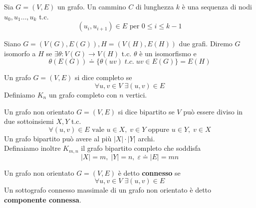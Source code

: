 \begin{definizione}[Cammino]
    Sia \(G=(V,E)\) un grafo. Un cammino \(C\) di lunghezza \(k\) è una sequenza di nodi \(u_0,u_1 \dots, u_k\) t.c.
    \begin{equation}
        (u_i,u_{i+1})\in E \text{ per } 0 \leq i \leq k-1
    \end{equation}
\end{definizione}

\begin{definizione}
    Siano \(G=(V(G),E(G)), H=(V(H),E(H))\) due grafi. Diremo \(G\) isomorfo a \(H\) se \(\exists \theta : V(G) \to V(H)\) t.c. \(\theta\) è un isomorfismo e
    \begin{equation}
        \theta(E(G)) \doteq \{ \theta(uv) \; t.c.\; uv \in E(G)\} = E(H)
    \end{equation}
\end{definizione}

\begin{definizione}
    Un grafo \(G=(V,E)\) si dice completo se
    \begin{equation}
        \forall u,v \in V \; \exists (u,v) \in E
    \end{equation}
    Definiamo \(K_n\) un grafo completo con \(n\) vertici.
\end{definizione}

\begin{definizione}
    Un grafo non orientato \(G=(V,E)\) si dice bipartito se \(V\) può essere diviso in due sottoinsiemi \(X,Y\) t.c.
    \begin{equation}
        \forall (u,v) \in E \text{ vale } u\in X,\; v\in Y \text{ oppure } u\in Y,\; v\in X
    \end{equation}
    Un grafo bipartito può avere al più \(|X|\cdot |Y|\) archi. \\
    Definaiamo inoltre \(K_{m,n}\) il grafo bipartito completo che soddisfa
    \begin{equation}
        |X|=m,\; |Y|=n,\; \varepsilon \doteq |E| = mn
    \end{equation}
\end{definizione}

\begin{definizione}[Connessione]
    Un grafo non orientato \(G=(V,E)\) è detto \textbf{connesso} se
    \begin{equation}
        \forall u,v \in V \; \exists (u,v) \in E
    \end{equation}
    Un sottografo connesso massimale di un grafo non orientato è detto \textbf{componente connessa}.
\end{definizione}

